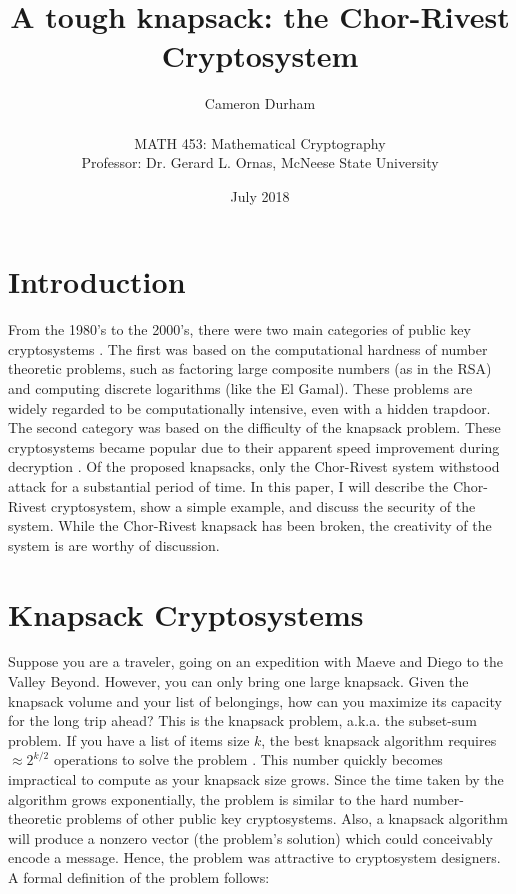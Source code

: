 \documentclass[12pt,a4paper,titlepage]{article}
\title{A tough knapsack: the Chor-Rivest Cryptosystem}
\author{Cameron Durham\\ \\MATH 453: Mathematical Cryptography\\Professor: Dr. Gerard L. Ornas, McNeese State University}
\date{July 2018}
\begin{document}
\maketitle
\tableofcontents
\newpage
\section{Introduction}

From the 1980's to the 2000's, there were two main categories of public key cryptosystems \cite{Chor84:1}.  The first was based on the computational hardness of number theoretic problems, such as factoring large composite numbers (as in the RSA) and computing discrete logarithms (like the El Gamal). These problems are widely regarded to be computationally intensive, even with a hidden trapdoor.  The second category was based on the difficulty of the knapsack problem. These cryptosystems became popular due to their apparent speed improvement during decryption \cite{survey:9}. Of the proposed knapsacks, only the Chor-Rivest system withstood attack for a substantial period of time. In this paper, I will describe the Chor-Rivest cryptosystem, show a simple example, and discuss the security of the system. While the Chor-Rivest knapsack has been broken, the creativity of the system is are worthy of discussion.

\section{Knapsack Cryptosystems}

\par Suppose you are a traveler, going on an expedition with Maeve and Diego to the Valley Beyond. However, you can only bring one large knapsack. Given the knapsack volume and your list of belongings, how can you maximize its capacity for the long trip ahead? This is the knapsack problem, a.k.a. the subset-sum problem. If you have a list of items size $k$, the best knapsack algorithm requires $\approx 2^{k/2}$ operations to solve the problem \cite{survey:9} . This number quickly becomes impractical to compute as your knapsack size grows. Since the time taken by the algorithm grows exponentially, the problem is similar to the hard number-theoretic problems of other public key cryptosystems. Also, a knapsack algorithm will produce a nonzero vector (the problem's solution) which could conceivably encode a message. Hence, the problem was attractive to cryptosystem designers.  A formal definition of the problem follows: 
\end{document}
